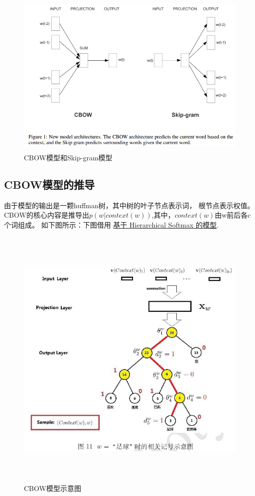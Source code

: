     \begin{figure}[h]
        \begin{center}
            \includegraphics[width=12cm,height=8cm]{2_3}
            \caption{CBOW模型和Skip-gram模型}
        \end{center}
    \end{figure}

    \subsection{CBOW模型的推导}
    由于模型的输出是一颗huffman树，其中树的叶子节点表示词，
    根节点表示权值。
    CBOW的核心内容是推导出$p(w|context(w))$,其中，$context(w)$由w前后各c个词组成。
    如下图所示：下图借用
    \href{http://blog.csdn.net/itplus/article/details/37969979}{基于 Hierarchical Softmax 的模型}.

    \begin{figure}[h]
        \begin{center}
            \includegraphics[width=12cm,height=13cm]{2_4}
            \caption{CBOW模型示意图}
        \end{center}
    \end{figure}

